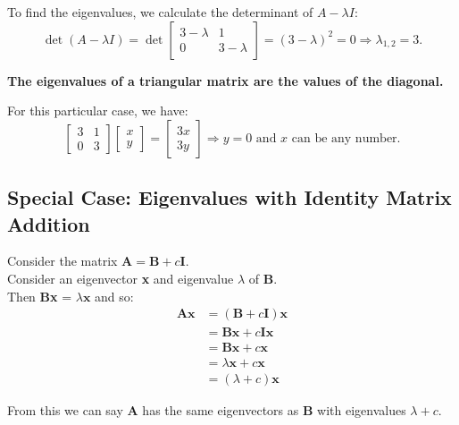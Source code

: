 To find the eigenvalues, we calculate the determinant of \( A - \lambda I \):
\[ \det(A - \lambda I) = \det \begin{bmatrix}
3 - \lambda & 1 \\
0 & 3 - \lambda
\end{bmatrix} = (3 - \lambda)^2 = 0 \Rightarrow \lambda_{1,2} = 3. \]

\textbf{The eigenvalues of a triangular matrix are the values of the diagonal.}

For this particular case, we have:
\[ \begin{bmatrix}
3 & 1 \\
0 & 3
\end{bmatrix}
\begin{bmatrix}
x \\
y
\end{bmatrix}
=
\begin{bmatrix}
3x \\
3y
\end{bmatrix}
\Rightarrow y = 0 \text{ and } x \text{ can be any number.}
\]
\subsection{Special Case: Eigenvalues with Identity Matrix Addition}
Consider the matrix $\textbf{A} = \textbf{B} + c\textbf{I}$.\\

Consider an eigenvector \textbf{x} and eigenvalue $\lambda$ of \textbf{B}.\\

Then \textbf{Bx} = $\lambda\textbf{x}$ and so:\\

\begin{align*}
    \textbf{Ax} &= (\textbf{B} + c\textbf{I})\textbf{x}\\
    &= \textbf{Bx} + c\textbf{Ix}\\
    &= \textbf{Bx} + c\textbf{x}\\
    &= \lambda\textbf{x} + c\textbf{x}\\
    &= (\lambda+ c)\textbf{x}
\end{align*}

From this we can say \textbf{A} has the same eigenvectors as \textbf{B} with eigenvalues $\lambda + c$.


